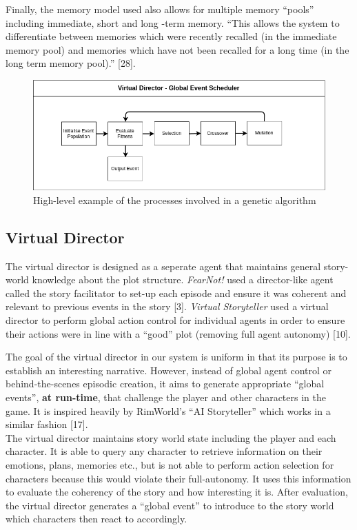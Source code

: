 \documentclass{sig-alternate-05-2015}
\begin{document}
Finally, the memory model used also allows for multiple memory ``pools'' including immediate, short and long -term memory. ``This allows the system to differentiate between memories which were recently recalled (in the immediate memory pool) and memories which have not been recalled for a long time (in the long term memory pool).'' [28].

\begin{figure}[t]
\centering
\includegraphics[scale=0.33]{Images/GeneticDirector.png}
\caption{High-level example of the processes involved in a genetic algorithm}
\end{figure}

\subsection{Virtual Director}

\noindent The virtual director is designed as a seperate agent that maintains general story-world knowledge about the plot structure. \textit{FearNot!} used a director-like agent called the story facilitator to set-up each episode and ensure it was coherent and relevant to previous events in the story [3]. \textit{Virtual Storyteller} used a virtual director to perform global action control for individual agents in order to ensure their actions were in line with a ``good'' plot (removing full agent autonomy) [10].

The goal of the virtual director in our system is uniform in that its purpose is to establish an interesting narrative. However, instead of global agent control or behind-the-scenes episodic creation, it aims to generate appropriate ``global events'', \textbf{at run-time}, that challenge the player and other characters in the game. It is inspired heavily by RimWorld's ``AI Storyteller'' which works in a similar fashion [17].\\

The virtual director maintains story world state including the player and each character. It is able to query any character to retrieve information on their emotions, plans, memories etc., but is not able to perform action selection for characters because this would violate their full-autonomy. It uses this information to evaluate the coherency of the story and how interesting it is. After evaluation, the virtual director generates a ``global event'' to introduce to the story world which characters then react to accordingly.
\end{document}
